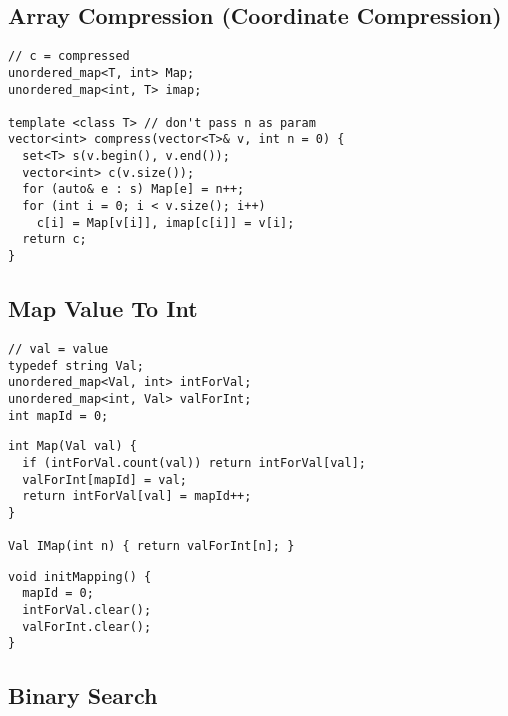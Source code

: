 \documentclass[twoside]{article}
\begin{document}
\begin{multicols*}{2}
\subsection*{Array Compression (Coordinate Compression)}
\begin{verbatim}
// c = compressed
unordered_map<T, int> Map;
unordered_map<int, T> imap;

template <class T> // don't pass n as param
vector<int> compress(vector<T>& v, int n = 0) {
  set<T> s(v.begin(), v.end());
  vector<int> c(v.size());
  for (auto& e : s) Map[e] = n++;
  for (int i = 0; i < v.size(); i++)
    c[i] = Map[v[i]], imap[c[i]] = v[i];
  return c;
}
\end{verbatim}

\subsectionfont{\large\bfseries\sffamily\underline}
\subsection*{Map Value To Int}
\begin{verbatim}
// val = value
typedef string Val;
unordered_map<Val, int> intForVal;
unordered_map<int, Val> valForInt;
int mapId = 0;
\end{verbatim}
\vspace{-12pt}
\begin{verbatim}
int Map(Val val) {
  if (intForVal.count(val)) return intForVal[val];
  valForInt[mapId] = val;
  return intForVal[val] = mapId++;
}

Val IMap(int n) { return valForInt[n]; }
\end{verbatim}
\vspace{-12pt}
\begin{verbatim}
void initMapping() {
  mapId = 0;
  intForVal.clear();
  valForInt.clear();
}
\end{verbatim}

\subsectionfont{\bfseries\sffamily\centering\LARGE}
\vspace{0em}
\subsection*{Binary Search}
\vspace{2em}
\subsubsectionfont{\large\bfseries\sffamily\underline}

\end{multicols*}
\end{document}
